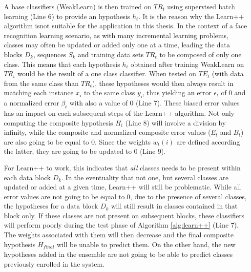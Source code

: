A base classifiers (WeakLearn) is then trained on $TR_t$ using supervised batch learning (Line 6) to provide an hypothesis $h_t$.
It is the reason why the Learn++ algorithm isnot suitable for the application in this thesis.
In the context of a face recognition learning scenario, as with many incremental learning problems, classes may often be updated or added only one at a time, leading the data blocks $D_k$, sequences $S_k$ and training data sets $TR_t$ to be composed of only one class.
This means that each hypothesis $h_t$ obtained after training WeakLearn 
on $TR_t$ would be the result of a one class classifier.
When tested on $TE_t$ (with data from the same class than $TR_t$), these hypotheses would then always result in matching each instance $x_i$ to the same class $y_i$, thus yielding an error $\epsilon_t$ of 0 and a normalized error $\beta_t$ with also a value of 0 (Line 7).
These biased error values has an impact on each subsequent steps of the Learn++ algorithm.
Not only computing the composite hypothesis $H_t$ (Line 8) will involve a division by infinity, while the composite and normalized composite error values ($E_t$ and $B_t$) are also going to be equal to 0.
Since the weights $w_t(i)$ are defined according the latter, they are going to be updated to 0 (Line 9).

For Learn++ to work, this indicates that \emph{all} classes needs to be present within each data block $D_k$.
In the eventuality that not one, but several classes are updated or added at a given time, Learn++ will still be problematic.
While all error values are not going to be equal to 0, due to the presence of several classes, the hypotheses for a data block $D_k$ will still result in classes contained in that block only.
If these classes are not present on subsequent blocks, these classifiers will perform poorly during the test phase of Algorithm \ref{alg:learn++} (Line 7).
The weights associated with them will then decrease and the final composite hypothesis $H_\textit{final}$ will be unable to predict them.
On the other hand, the new hypotheses added in the ensemble are not going to be able to predict classes previously enrolled in the system.